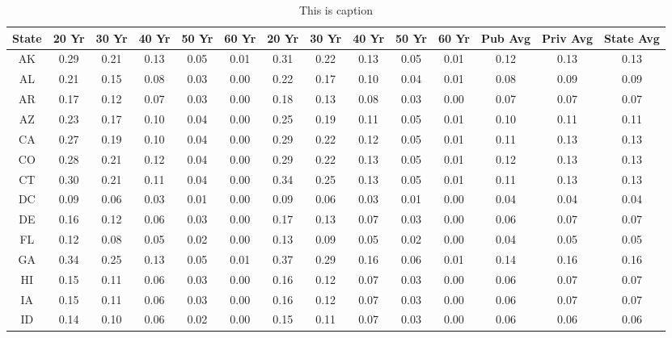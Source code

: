 \begin{table}
\centering
\caption{This is caption}
\label{tab:welfare_close}
\begin{tabular}{cccccccccccccc}
\toprule
State & 20 Yr & 30 Yr & 40 Yr & 50 Yr & 60 Yr & 20 Yr & 30 Yr & 40 Yr & 50 Yr & 60 Yr & Pub Avg & Priv Avg & State Avg \\
\midrule
   AK &  0.29 &  0.21 &  0.13 &  0.05 &  0.01 &  0.31 &  0.22 &  0.13 &  0.05 &  0.01 &    0.12 &     0.13 &      0.13 \\
   AL &  0.21 &  0.15 &  0.08 &  0.03 &  0.00 &  0.22 &  0.17 &  0.10 &  0.04 &  0.01 &    0.08 &     0.09 &      0.09 \\
   AR &  0.17 &  0.12 &  0.07 &  0.03 &  0.00 &  0.18 &  0.13 &  0.08 &  0.03 &  0.00 &    0.07 &     0.07 &      0.07 \\
   AZ &  0.23 &  0.17 &  0.10 &  0.04 &  0.00 &  0.25 &  0.19 &  0.11 &  0.05 &  0.01 &    0.10 &     0.11 &      0.11 \\
   CA &  0.27 &  0.19 &  0.10 &  0.04 &  0.00 &  0.29 &  0.22 &  0.12 &  0.05 &  0.01 &    0.11 &     0.13 &      0.13 \\
   CO &  0.28 &  0.21 &  0.12 &  0.04 &  0.00 &  0.29 &  0.22 &  0.13 &  0.05 &  0.01 &    0.12 &     0.13 &      0.13 \\
   CT &  0.30 &  0.21 &  0.11 &  0.04 &  0.00 &  0.34 &  0.25 &  0.13 &  0.05 &  0.01 &    0.11 &     0.13 &      0.13 \\
   DC &  0.09 &  0.06 &  0.03 &  0.01 &  0.00 &  0.09 &  0.06 &  0.03 &  0.01 &  0.00 &    0.04 &     0.04 &      0.04 \\
   DE &  0.16 &  0.12 &  0.06 &  0.03 &  0.00 &  0.17 &  0.13 &  0.07 &  0.03 &  0.00 &    0.06 &     0.07 &      0.07 \\
   FL &  0.12 &  0.08 &  0.05 &  0.02 &  0.00 &  0.13 &  0.09 &  0.05 &  0.02 &  0.00 &    0.04 &     0.05 &      0.05 \\
   GA &  0.34 &  0.25 &  0.13 &  0.05 &  0.01 &  0.37 &  0.29 &  0.16 &  0.06 &  0.01 &    0.14 &     0.16 &      0.16 \\
   HI &  0.15 &  0.11 &  0.06 &  0.03 &  0.00 &  0.16 &  0.12 &  0.07 &  0.03 &  0.00 &    0.06 &     0.07 &      0.07 \\
   IA &  0.15 &  0.11 &  0.06 &  0.03 &  0.00 &  0.16 &  0.12 &  0.07 &  0.03 &  0.00 &    0.06 &     0.07 &      0.07 \\
   ID &  0.14 &  0.10 &  0.06 &  0.02 &  0.00 &  0.15 &  0.11 &  0.07 &  0.03 &  0.00 &    0.06 &     0.06 &      0.06 \\

\end{tabular}
\end{table}

